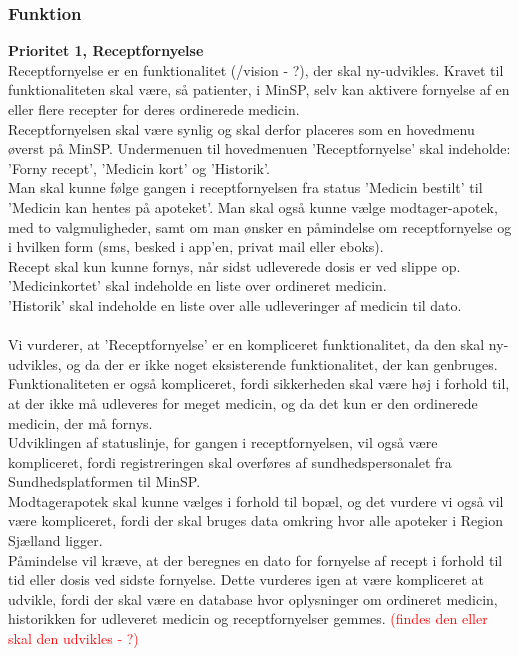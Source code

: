  \subsubsection{Funktion}  
 \textbf{Prioritet 1, Receptfornyelse}\\
 Receptfornyelse er en funktionalitet (/vision - ?), der skal ny-udvikles. Kravet til funktionaliteten skal være, så patienter, i MinSP, selv kan aktivere fornyelse af en eller flere recepter for deres ordinerede medicin. 
 \\
 Receptfornyelsen skal være synlig og skal derfor placeres som en hovedmenu øverst på MinSP. Undermenuen til hovedmenuen 'Receptfornyelse' skal indeholde: 'Forny recept', 'Medicin kort' og 'Historik'.
 \\
 Man skal kunne følge gangen i receptfornyelsen fra status 'Medicin bestilt' til 'Medicin kan hentes på apoteket'. Man skal også kunne vælge modtager-apotek, med to valgmuligheder, samt om man ønsker en påmindelse om receptfornyelse og i hvilken form (sms, besked i app'en, privat mail eller eboks). 
 \\ 
 Recept skal kun kunne fornys, når sidst udleverede dosis er ved slippe op.  
 \\
 'Medicinkortet' skal indeholde en liste over ordineret medicin.\\ 
 'Historik' skal indeholde en liste over alle udleveringer af medicin til dato.
 \\ \\
 Vi vurderer, at 'Receptfornyelse' er en kompliceret funktionalitet, da den skal ny-udvikles, og da der er ikke noget eksisterende funktionalitet, der kan genbruges. Funktionaliteten er også kompliceret, fordi sikkerheden skal være høj i forhold til, at der ikke må udleveres for meget medicin, og da det kun er den ordinerede medicin, der må fornys. \\
 Udviklingen af statuslinje, for gangen i receptfornyelsen, vil også være kompliceret, fordi registreringen skal overføres af sundhedspersonalet fra Sundhedsplatformen til MinSP.\\
 Modtagerapotek skal kunne vælges i forhold til bopæl, og det vurdere vi også vil være kompliceret, fordi der skal bruges data omkring hvor alle apoteker i Region Sjælland ligger.\\
 Påmindelse vil kræve, at der beregnes en dato for fornyelse af recept i forhold til tid eller dosis ved sidste fornyelse. Dette vurderes igen at være kompliceret at udvikle, fordi der skal være en database hvor oplysninger om ordineret medicin, historikken for udleveret medicin og receptfornyelser gemmes. \textcolor{red}{(findes den eller skal den udvikles - ?)} \\ 
